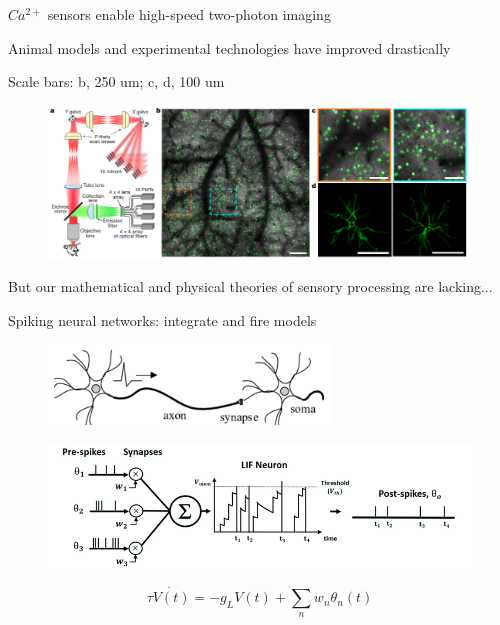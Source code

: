 \documentclass[aspectratio=169]{beamer}
\begin{document}
\begin{frame}{$Ca^{2+}$ sensors enable high-speed two-photon imaging}

Animal models and experimental technologies have improved drastically

Scale bars: b, 250 um; c, d, 100 um
\begin{figure}
\centering
\includegraphics[width=140mm]{figure-16}
\end{figure}

But our mathematical and physical theories of sensory processing are lacking...

\end{frame}

\begin{frame}{Spiking neural networks: integrate and fire models}


\begin{figure}
\centering
\includegraphics[width=75mm]{figure-15}
\end{figure}

\begin{figure}
\centering
\includegraphics[width=125mm]{figure-14}
\end{figure}

\begin{equation*}
\tau\dot{V(t)} = -g_{L}V(t) + \sum_{n} w_{n}\theta_{n}(t)
\end{equation*}

\end{frame}
\end{document}

